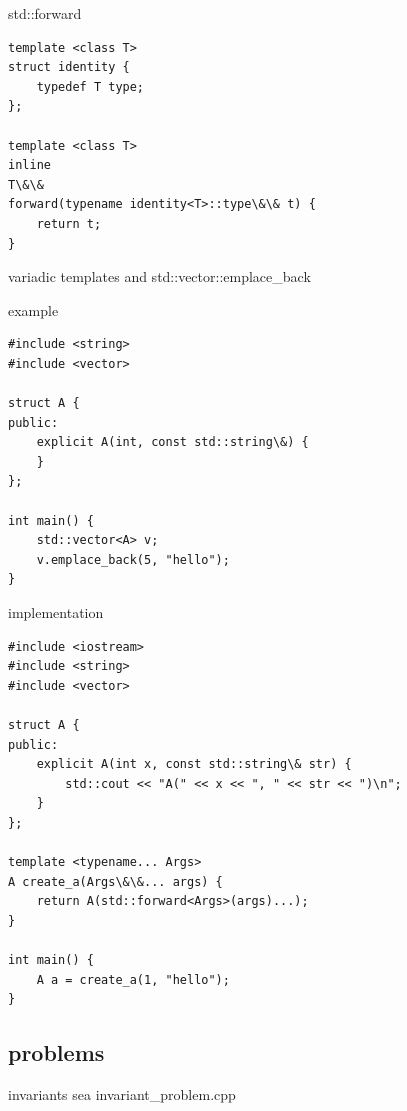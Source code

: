 \documentclass{beamer}
\begin{document}
\begin{frame}{std::forward}
  \begin{block}{}
\begin{verbatim}
template <class T>
struct identity {
    typedef T type;
};

template <class T>
inline
T\&\&
forward(typename identity<T>::type\&\& t) {
    return t;
}

\end{verbatim}
  \end{block}
\end{frame}

\begin{frame}{variadic templates and std::vector::emplace\_back}
  \begin{block}{example}
\begin{verbatim}
#include <string>
#include <vector>

struct A {
public:
    explicit A(int, const std::string\&) {
    }
};

int main() {
    std::vector<A> v;
    v.emplace_back(5, "hello");
}

\end{verbatim}
  \end{block}
\end{frame}

\begin{frame}
  \begin{block}{implementation}
\begin{verbatim}
#include <iostream>
#include <string>
#include <vector>

struct A {
public:
    explicit A(int x, const std::string\& str) {
        std::cout << "A(" << x << ", " << str << ")\n";
    }
};

template <typename... Args>
A create_a(Args\&\&... args) {
    return A(std::forward<Args>(args)...);
}

int main() {
    A a = create_a(1, "hello");
}

\end{verbatim}
  \end{block}
\end{frame}

\subsection{problems}
\begin{frame}{invariants}
  sea invariant\_problem.cpp
\end{frame}
\end{document}
